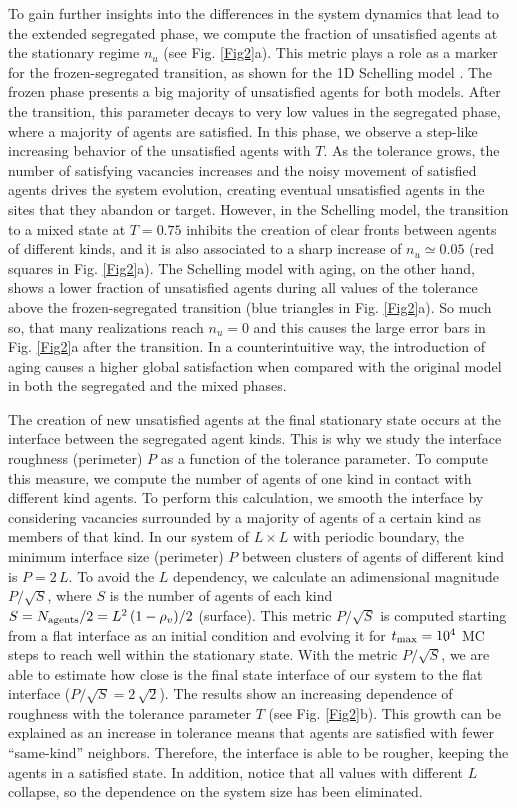 To gain further insights into the differences in the system dynamics that lead to the extended segregated phase, we compute the fraction of unsatisfied agents at the stationary regime $n_u$ (see Fig. \ref{Fig2}a). This metric plays a role as a marker for the frozen-segregated transition, as shown for the 1D Schelling model \cite{Dall_Asta_2008}. The frozen phase presents a big majority of unsatisfied agents for both models. After the transition, this parameter decays to very low values in the segregated phase, where a majority of agents are satisfied. In this phase, we observe a step-like increasing behavior of the unsatisfied agents with $T$. As the tolerance grows, the number of satisfying vacancies increases and the noisy movement of satisfied agents drives the system evolution, creating eventual unsatisfied agents in the sites that they abandon or target. However, in the Schelling model, the transition to a mixed state at $T = 0.75$ inhibits the creation of clear fronts between agents of different kinds, and it is also associated to a sharp increase of $n_u \simeq 0.05 $ (red squares in Fig. \ref{Fig2}a). The Schelling model with aging, on the other hand, shows a lower fraction of unsatisfied agents during all values of the tolerance above the frozen-segregated transition (blue triangles in Fig. \ref{Fig2}a). So much so, that many realizations reach $n_u = 0$ and this causes the large error bars in Fig. \ref{Fig2}a after the transition. In a counterintuitive way, the introduction of aging causes a higher global satisfaction when compared with the original model in both the segregated and the mixed phases.

The creation of new unsatisfied agents at the final stationary state occurs at the interface between the segregated agent kinds. This is why we study the interface roughness (perimeter) $P$ as a function of the tolerance parameter. To compute this measure, we compute the number of agents of one kind in contact with different kind agents. To perform this calculation, we smooth the interface by considering vacancies surrounded by a majority of agents of a certain kind as members of that kind. In our system of $L \times L$ with periodic boundary, the minimum interface size (perimeter) $P$ between clusters of agents of different kind is $P = 2 \, L$. To avoid the $L$ dependency, we calculate an adimensional magnitude $P/\sqrt{S}$, where $S$ is the number of agents of each kind $S = N_{\rm{agents}}/2 = L^2 \, (1 - \rho_v )/2 $ (surface). This metric $P/\sqrt{S}$ is computed starting from a flat interface as an initial condition and evolving it for $t_{\rm{max}} = 10^4$ MC steps to reach well within the stationary state. With the metric $P/\sqrt{S}$, we are able to estimate how close is the final state interface of our system to the flat interface ($P/\sqrt{S} = 2 \, \sqrt{2}$). The results show an increasing dependence of roughness with the tolerance parameter $T$ (see Fig. \ref{Fig2}b). This growth can be explained as an increase in tolerance means that agents are satisfied with fewer ``same-kind'' neighbors. Therefore, the interface is able to be rougher, keeping the agents in a satisfied state. In addition, notice that all values with different $L$ collapse, so the dependence on the system size has been eliminated. 

